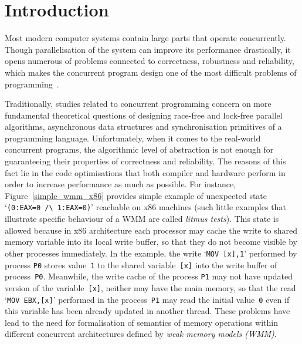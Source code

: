 
\chapter{Introduction}
\label{ch:intro}

Most modern computer systems contain large parts that operate concurrently. Though parallelisation of the system can improve its performance drastically, it opens numerous of problems connected to correctness, robustness and reliability, which makes the concurrent program design one of the most difficult problems of programming~\cite{mckenney2017parallel}.

Traditionally, studies related to concurrent programming concern on more fundamental theoretical questions of designing race-free and lock-free parallel algorithms, asynchronous data structures and synchronisation primitives of a programming language. Unfortunately, when it comes to the real-world concurrent programs, the algorithmic level of abstraction is not enough for guaranteeing their properties of correctness and reliability. The reasons of this fact lie in the code optimisations that both compiler and hardware perform in order to increase performance as much as possible. For instance, Figure~\ref{simple_wmm_x86} provides simple example of unexpected state `\texttt{(0:EAX=0~/\textbackslash~1:EAX=0)}' reachable on x86 machines (such little examples that illustrate specific behaviour of a WMM are called \textit{litmus tests}).
This state is allowed because in x86 architecture each processor may cache the write to shared memory variable into its local write buffer, so that they do not become visible by other processes immediately. In the example, the write `\texttt{MOV~[x],1}' performed by process \texttt{P0} stores value~\texttt{1} to the shared variable~\texttt{[x]} into the write buffer of process~\texttt{P0}. Meanwhile, the write cache of the process \texttt{P1} may not have updated version of the variable~\texttt{[x]}, neither may have the main memory, so that the read `\texttt{MOV~EBX,[x]}' performed in the process~\texttt{P1} may read the initial value~\texttt{0} even if this variable has been already updated in another thread. These problems have lead to the need for formalisation of semantics of memory operations within different concurrent architectures defined by \textit{weak	memory models (WMM)}.

